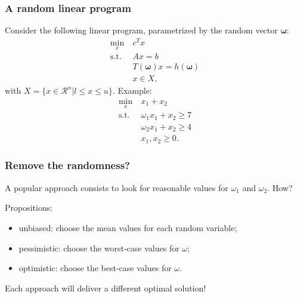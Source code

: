 \documentclass{beamer}
\def\bomega{\boldsymbol\omega}
\def\rit{\mathcal{R}}
\begin{document}
\begin{frame}
	\frametitle{A random linear program}
	
	Consider the following linear program, parametrized by the random vector $\bomega$:
	\begin{align*}
	\min_x\ & c^T x \\
	\mbox{s.t. } & Ax = b \\
	& T(\bomega)x = h(\bomega) \\
	& x \in X,
	\end{align*}
	with $X = \lbrace x \in \rit^n | l \leq x \leq u \rbrace$. Example:
	\begin{align*}
	\min_x\ & x_1+x_2\\
	\mbox{s.t. } & \omega_1x_1 + x_2 \geq 7 \\
	& \omega_2x_1 + x_2 \geq 4 \\
	& x_1, x_2 \geq 0.
	\end{align*}
\end{frame}

\begin{frame}
	\frametitle{Remove the randomness?}
	
	A popular approach consists to look for reasonable values for $\omega_1$ and $\omega_2$.
	How?
	
	\mbox{}
	
	Propositions:
	\begin{itemize}
		\item unbiased: choose the mean values for each random variable;
		\item pessimistic: choose the worst-case values for $\omega$;
		\item optimistic: choose the best-case values for $\omega$.
	\end{itemize}
	
	Each approach will deliver a different optimal solution!
	
\end{frame}
\end{document}
